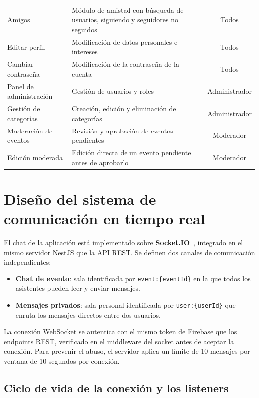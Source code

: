 \begin{table}[H]
{\begin{tabular}{|l|l|c|}
Amigos & Módulo de amistad con búsqueda de usuarios, siguiendo y seguidores no seguidos & Todos \\
Editar perfil & Modificación de datos personales e intereses & Todos \\
Cambiar contraseña & Modificación de la contraseña de la cuenta & Todos \\
Panel de administración & Gestión de usuarios y roles & Administrador \\
Gestión de categorías & Creación, edición y eliminación de categorías & Administrador \\
Moderación de eventos & Revisión y aprobación de eventos pendientes & Moderador \\
Edición moderada & Edición directa de un evento pendiente antes de aprobarlo & Moderador \\
\hline
\end{tabular}%
}
\end{table}


\section{Diseño del sistema de comunicación en tiempo real}

El chat de la aplicación está implementado sobre \textbf{Socket.IO}~\cite{socketio}, integrado en el mismo servidor NestJS que la API REST. Se definen dos canales de comunicación independientes:

\begin{itemize}
    \item \textbf{Chat de evento}: sala identificada por \texttt{event:\{eventId\}} en la que todos los asistentes pueden leer y enviar mensajes.
    \item \textbf{Mensajes privados}: sala personal identificada por \texttt{user:\{userId\}} que enruta los mensajes directos entre dos usuarios.
\end{itemize}

La conexión WebSocket se autentica con el mismo token de Firebase que los endpoints REST, verificado en el middleware del socket antes de aceptar la conexión. Para prevenir el abuso, el servidor aplica un límite de 10 mensajes por ventana de 10 segundos por conexión.

\subsection{Ciclo de vida de la conexión y los listeners}

